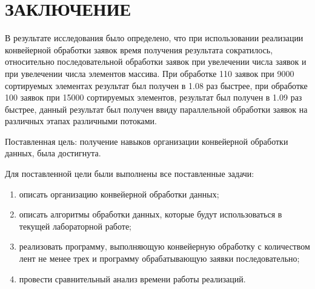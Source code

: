 \chapter*{\hfill{\centering  ЗАКЛЮЧЕНИЕ}\hfill}

В результате исследования было определено, что при использовании реализации конвейерной обработки заявок время получения результата сократилось, относительно последовательной обработки заявок при увелечении числа заявок и при увелечении числа элементов массива.
При обработке 110 заявок при 9000 сортируемых элементах результат был получен в 1.08 раз быстрее, при обработке 100 заявок при 15000 сортируемых элементов, результат был получен в 1.09 раз быстрее, данный результат был получен ввиду параллельной обработки заявок на различных этапах различными потоками.





Поставленная цель: получение навыков организации конвейерной обработки данных, была достигнута.

Для поставленной цели были выполнены все поставленные задачи:
\begin{enumerate}
	\item описать организацию конвейерной обработки данных;
	\item описать алгоритмы обработки данных, которые будут использоваться в текущей лабораторной работе;
	\item реализовать программу, выполняющую конвейерную обработку с количеством лент не менее трех  и программу обрабатывающую заявки последовательно;
	\item провести сравнительный анализ времени работы реализаций.
\end{enumerate}

